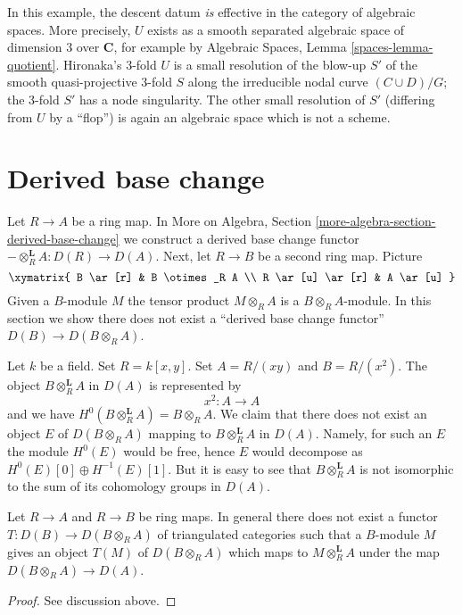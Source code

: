\noindent
In this example, the descent datum {\it is }effective in the category
of algebraic spaces. More precisely,
$U$ exists as a smooth separated algebraic space
of dimension 3 over ${\mathbf C}$,
for example by Algebraic Spaces, Lemma \ref{spaces-lemma-quotient}.
Hironaka's 3-fold $U$ is a small resolution of the blow-up $S'$
of the smooth quasi-projective 3-fold $S$ along the irreducible nodal curve
$(C\cup D)/G$; the 3-fold $S'$ has a node singularity. The
other small resolution of $S'$ (differing from $U$ by a ``flop'')
is again an algebraic space which is not a scheme.



\section{Derived base change}
\label{section-derived-base-change}

\noindent
Let $R \to A$ be a ring map. In
More on Algebra, Section \ref{more-algebra-section-derived-base-change}
we construct a derived base change functor
$- \otimes_R^\mathbf{L} A : D(R) \to D(A)$.
Next, let $R \to B$ be a second ring map. Picture
$$
\xymatrix{
B \ar[r] & B \otimes_R A \\
R \ar[u] \ar[r] & A \ar[u]
}
$$
Given a $B$-module $M$ the tensor product $M \otimes_R A$ is a
$B \otimes_R A$-module. In this section we show there does not exist a
``derived base change functor'' $D(B) \to D(B \otimes_R A)$.

\medskip\noindent
Let $k$ be a field. Set $R = k[x, y]$. Set $A = R/(xy)$ and $B = R/(x^2)$.
The object $B \otimes_R^\mathbf{L} A$ in $D(A)$ is represented by
$$
x^2 : A \longrightarrow A
$$
and we have $H^0(B \otimes_R^\mathbf{L} A) = B \otimes_R A$. We claim that
there does not exist an object $E$ of $D(B \otimes_R A)$ mapping to
$B \otimes_R^\mathbf{L} A$ in $D(A)$. Namely, for such an $E$ the module
$H^0(E)$ would be free, hence $E$ would decompose as
$H^0(E)[0] \oplus H^{-1}(E)[1]$. But it is easy to see that
$B \otimes_R^\mathbf{L} A$ is not isomorphic to the sum of its
cohomology groups in $D(A)$.

\begin{lemma}
\label{lemma-no-derived-base-change}
Let $R \to A$ and $R \to B$ be ring maps. In general there does not
exist a functor $T : D(B) \to D(B \otimes_R A)$
of triangulated categories such that a $B$-module $M$ gives an
object $T(M)$ of $D(B \otimes_R A)$ which maps to
$M \otimes_R^\mathbf{L} A$ under the map $D(B \otimes_R A) \to D(A)$.
\end{lemma}

\begin{proof}
See discussion above.
\end{proof}









